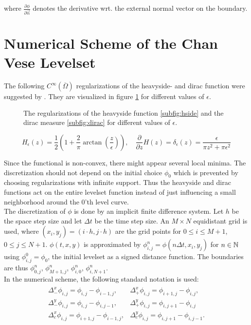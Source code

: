 where $\frac{\partial\phi}{\partial \vec{n}}$ denotes the derivative wrt. the external normal vector on the boundary.


\section{Numerical Scheme of the Chan Vese Levelset}\label{section:numscheme}
The following $C^\infty(\overline{\Omega})$ regularizations of the heavyside- and dirac function were suggested by \cite{chan.01}. They are visualized in figure \ref{fig:regularizations} for different values of $\epsilon$.
\begin{figure}
  \centering
  \quad
  \caption{The regularizations of the heavyside function \ref{subfig:hside} and the dirac measure \ref{subfig:dirac} for different values of $\epsilon$.}\label{fig:regularizations}
\end{figure}
\begin{equation}
  H_\epsilon(z) = \frac{1}{2}\left(1+\frac{2}{\pi}\arctan\left(\frac{z}{\epsilon}\right)\right),\quad \frac{\partial}{\partial z}H(z) = \delta_\epsilon(z) = \frac{\epsilon}{\pi z^2+\pi\epsilon^2}
\end{equation}

Since the functional is non-convex, there might appear several local minima. The discretization should not depend on the initial choice $\phi_0$ which is prevented by choosing regularizations with infinite support. Thus the heavyside and dirac functions act on the entire levelset function instead of just influencing a small neighborhood around the 0'th level curve.\\

The discretization of $\phi$ is done by an implicit finite difference system. Let $h$ be the space step size and let $\Delta t$ be the time step size. An $M\times N$ equidistant grid is used, where $(x_i,y_j) = (i\cdot h,j\cdot h)$ are the grid points for $0\leq i \leq M+1$, $0\leq j \leq N+1$. $\phi(t,x,y)$ is approximated by $\phi_{i,j}^n = \phi(n\Delta t, x_i,y_j)$ for $n\in\mathbb N$ using $\phi_{i,j}^0 = \phi_0$, the initial levelset as a signed distance function. The boundaries are thus $\phi_{0,j}^n$, $\phi_{M+1,j}^n$, $\phi_{i,0}^n$, $\phi_{i,N+1}^n$.\\

In the numerical scheme, the following standard notation is used:
\begin{align}
\begin{array}{ll}
\Delta_{-}^x \phi_{i,j} = \phi_{i,j}-\phi_{i-1,j}, & \Delta_{+}^x \phi_{i,j} = \phi_{i+1,j}-\phi_{i,j},\\
\Delta_{-}^y \phi_{i,j} = \phi_{i,j}-\phi_{i,j-1}, & \Delta_{+}^y \phi_{i,j} = \phi_{i,j+1}-\phi_{i,j}\\
\Delta_c^x  \phi_{i,j} = \phi_{i+1,j}-\phi_{i-1,j},& \Delta_c^y \phi_{i,j} = \phi_{i,j+1}-\phi_{i,j-1}.
\end{array}
\end{align}

